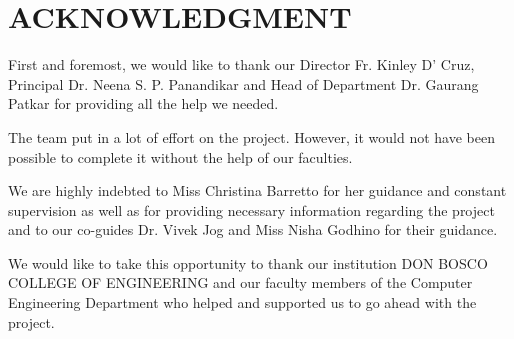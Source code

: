 \chapter*{ACKNOWLEDGMENT}

First and foremost, we would like to thank our Director Fr. Kinley D’ Cruz, 
Principal Dr. Neena S. P. Panandikar and Head of Department Dr. Gaurang Patkar 
for providing all the help we needed.

The team put in a lot of effort on the project. However, it would not have 
been possible to complete it without the help of our faculties.

We are highly indebted to Miss Christina Barretto for her guidance 
and constant supervision as well as for providing necessary information 
regarding the project and to our co-guides Dr. Vivek Jog and Miss Nisha 
Godhino for their guidance.

We would like to take this opportunity to thank our institution 
DON BOSCO COLLEGE OF ENGINEERING and our faculty members of the 
Computer Engineering Department who helped and supported us to 
go ahead with the project.

